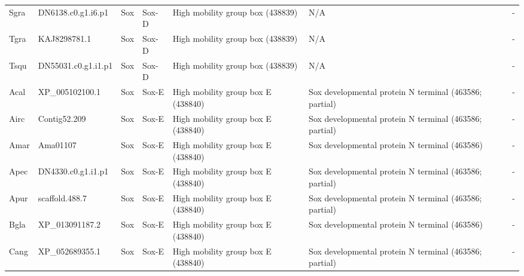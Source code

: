 \documentclass[../main.tex]{subfiles}
\begin{document}
\begin{landscape}
\begin{longtable}{lllllll}
		Sgra           & DN6138.c0.g1.i6.p1    & Sox            & Sox-D               & High mobility group box (438839)            & N/A                                                                    & -                    \\
		Tgra           & KAJ8298781.1          & Sox            & Sox-D               & High mobility group box (438839)            & N/A                                                                    & -                    \\
		Tsqu           & DN55031.c0.g1.i1.p1   & Sox            & Sox-D               & High mobility group box (438839)            & N/A                                                                    & -                    \\
		Acal           & XP\_005102100.1       & Sox            & Sox-E               & High mobility group box E (438840)          & Sox developmental protein N terminal (463586; partial)                 & -                    \\
		Airc           & Contig52.209          & Sox            & Sox-E               & High mobility group box E (438840)          & Sox developmental protein N terminal (463586; partial)                 & -                    \\
		Amar           & Ama01107              & Sox            & Sox-E               & High mobility group box E (438840)          & Sox developmental protein N terminal (463586)                          & -                    \\
		Apec           & DN4330.c0.g1.i1.p1    & Sox            & Sox-E               & High mobility group box E (438840)          & Sox developmental protein N terminal (463586; partial)                 & -                    \\
		Apur           & scaffold.488.7        & Sox            & Sox-E               & High mobility group box E (438840)          & Sox developmental protein N terminal (463586; partial)                 & -                    \\
		Bgla           & XP\_013091187.2       & Sox            & Sox-E               & High mobility group box E (438840)          & Sox developmental protein N terminal (463586)                          & -                    \\
		Cang           & XP\_052689355.1       & Sox            & Sox-E               & High mobility group box E (438840)          & Sox developmental protein N terminal (463586; partial)                 & -                    \\

\end{longtable}
\end{landscape}
\end{document}
